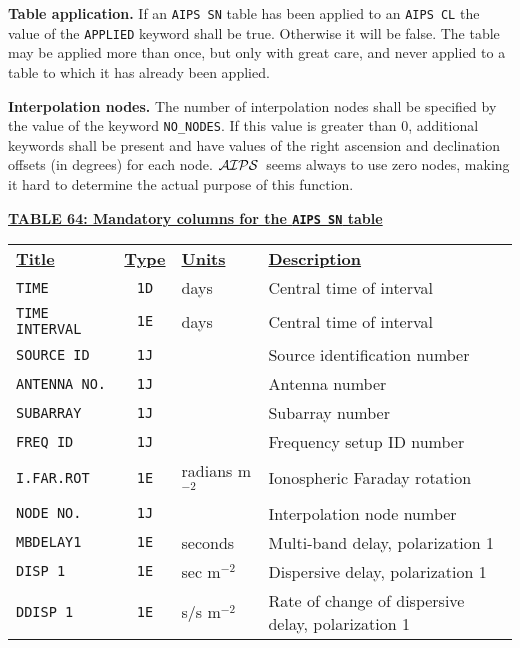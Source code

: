 \documentclass[twoside]{article}
\newcommand{\Hi}[1]{\textcolor{hicol}{#1}}
\newcommand{\AIPS}{{$\cal AIPS\/$}}
\begin{document}
{\bf Table application. } If an {\tt AIPS SN} table has been applied
to an {\tt AIPS CL} the value of the {\tt APPLIED} keyword shall be
true.  Otherwise it will be false.  The table may be applied more than
once, but only with great care, and never applied to a table to which
it has already been applied.

{\bf Interpolation nodes.} The number of interpolation nodes shall be
specified by the value of the keyword {\tt NO\_NODES}\@.  If this
value is greater than 0, additional keywords shall be present and have
values of the right ascension and declination offsets (in degrees) for
each node.  \AIPS\ seems always to use zero nodes, making it hard to
determine the actual purpose of this function.

\vfill\eject
\begin{center}
\underline{\bf{TABLE 64: Mandatory columns for the {\tt AIPS SN} table}}\\
\begin{tabular}{lcll}
\noalign{\vspace{2pt}} \label{ta:SNcols}
\underline{{\bf Title\vphantom{y}}} & \underline{\bf{Type}} &
   \underline{{\bf Units\vphantom{y}}} & \underline{\bf{Description}} \\
\noalign{\vspace{2pt}}
{\tt TIME}          & {\tt 1D} & days & Central time of interval \\
{\tt TIME INTERVAL} & {\tt 1E} & days & Central time of interval \\
{\tt SOURCE ID}     & {\tt 1J} &      & Source identification number \\
{\tt ANTENNA NO.}   & {\tt 1J} &      & Antenna number \\
{\tt SUBARRAY}      & {\tt 1J} &      & Subarray number \\
{\tt FREQ ID}       & {\tt 1J} &      & Frequency setup ID number \\
{\tt I.FAR.ROT}     & {\tt 1E} & radians m$^{-2}$ & Ionospheric Faraday rotation \\
{\tt NODE NO.}      & {\tt 1J} &      & Interpolation node number \\
{\tt MBDELAY1}      & {\tt 1E} & seconds & Multi-band delay, polarization 1 \\
\Hi{{\tt DISP 1}}   & \Hi{{\tt 1E}} & \Hi{sec m$^{-2}$} & \Hi{Dispersive delay, polarization 1} \\
\Hi{{\tt DDISP 1}}  & \Hi{{\tt 1E}} & \Hi{s/s m$^{-2}$} & \Hi{Rate of change of dispersive delay, polarization 1} \\

\end{tabular}
\end{center}
\end{document}
